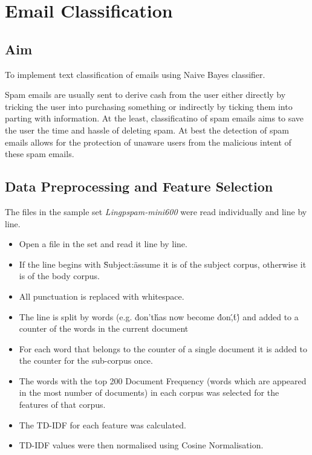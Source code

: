 \documentclass[10pt, a4paper]{article}
\begin{document}
\section{Email Classification}

\subsection*{Aim}

To implement text classification of emails using Naive Bayes classifier.

Spam emails are usually sent to derive cash from the user either directly by tricking the user into purchasing something or indirectly by ticking them into parting with information. At the least, classificatino of spam emails aims to save the user the time and hassle of deleting spam. At best the detection of spam emails allows for the protection of unaware users from the malicious intent of these spam emails.

\subsection*{Data Preprocessing and Feature Selection}
The files in the sample set \emph{Lingpspam-mini600} were read individually and line by line.
\begin{itemize}
\item Open a file in the set and read it line by line.
\item If the line begins with \"Subject:\" assume it is of the subject corpus, otherwise it is of the body corpus.
\item All punctuation is replaced with whitespace.
\item The line is split by words (e.g. \'don't\' has now become \'don\',\'t\') and added to a counter of the words in the current document
\item For each word that belongs to the counter of a single document it is added to the counter for the sub-corpus once.
\item The words with the top 200 Document Frequency (words which are appeared in the most number of documents) in each corpus was selected for the features of that corpus.
\item The TD-IDF for each feature was calculated.
\item TD-IDF values were then normalised using Cosine Normalisation.
\end{itemize}
\end{document}
